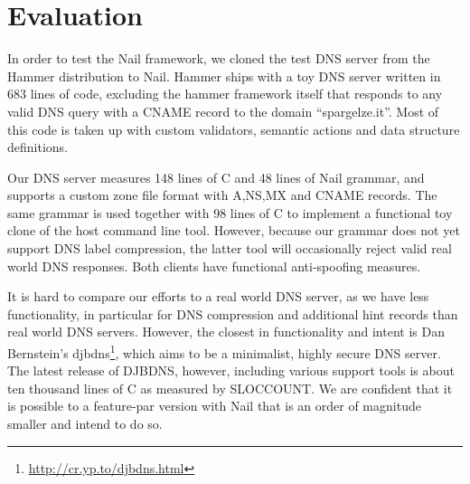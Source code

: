 \section{Evaluation}
\label{s:eval}

In order to test the Nail framework, we cloned the test DNS server from the Hammer distribution to
Nail. Hammer ships with a toy DNS server written in 683 lines of code, excluding the hammer
framework itself that responds to any valid DNS query with a CNAME record to the domain
``spargelze.it''.  Most of this code is taken up with custom validators, semantic actions and data
structure definitions. 

Our DNS server measures 148 lines of C and 48 lines of Nail grammar, and supports a custom zone file format
with A,NS,MX and CNAME records. The same grammar is used together with 98 lines of C to implement a
functional toy clone of the host command line tool. However, because our grammar does not yet
support DNS label compression, the latter tool will occasionally reject valid real world DNS
responses. Both clients have functional anti-spoofing measures.

It is hard to compare our efforts to a real world DNS server, as we have less functionality, in
particular for DNS compression and additional hint records than real world DNS servers. 
However, the closest in functionality and intent is Dan Bernstein's djbdns\footnote{\url{http://cr.yp.to/djbdns.html}}, which aims
to be a minimalist, highly secure DNS server. The latest release of DJBDNS, however, including
various support tools is about ten thousand lines of C as measured by SLOCCOUNT. We are confident
that it is possible to a feature-par version with Nail that is an order of magnitude smaller and
intend to do so.


